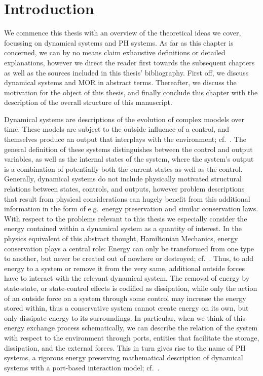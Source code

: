 \chapter{Introduction}\label{chap:introduction}

We commence this thesis with an overview of the theoretical ideas we cover, focussing on dynamical systems and \ac{PH} systems.
As far as this chapter is concerned, we can by no means claim exhaustive definitions or detailed explanations, however we direct the reader first towards the subsequent chapters as well as the sources included in this thesis' bibliography.
First off, we discuss dynamical systems and \ac{MOR} in abstract terms.
Thereafter, we discuss the motivation for the object of this thesis, and finally conclude this chapter with the description of the overall structure of this manuscript.

Dynamical systems are descriptions of the evolution of complex moodels over time.
These models are subject to the outside influence of a control, and themselves produce an output that interplays with the environment; cf.~\cite{Hinrichsen2005}.
The general definition of these systems distinguishes between the control and output variables, as well as the internal states of the system, where the system's output is a combination of potentially both the current states as well as the control.
Generally, dynamical systems do not include physically motivated structural relations between states, controls, and outputs, however problem descriptions that result from physical considerations can hugely benefit from this additional information in the form of e.g.\ energy preservation and similar conservation laws.
With respect to the problems relevant to this thesis we especially consider the energy contained within a dynamical system as a quantity of interest.
In the physics equivalent of this abstract thought, Hamiltonian Mechanics, energy conservation plays a central role: Energy can only be transformed from one type to another, but never be created out of nowhere or destroyed; cf.~\cite{Taylor2005, Giorgilli2022}.
Thus, to add energy to a system or remove it from the very same, additional outside forces have to interact with the relevant dynamical system.
The removal of energy by state-state, or state-control effects is codified as dissipation, while only the action of an outside force on a system through some control may increase the energy stored within, thus a conservative system cannot create energy on its own, but only dissipate energy to its surroundings.
In particular, when we think of this energy exchange process schematically, we can describe the relation of the system with respect to the environment through ports, entities that facilitate the storage, dissipation, and the external forces.
This in turn gives rise to the name of \ac{PH} systems, a rigorous energy preserving mathematical description of dynamical systems with a port-based interaction model; cf.~\cite{Duindam2009, Jacob2012, VanDerSchaft2014, Mehrmann2022}.

